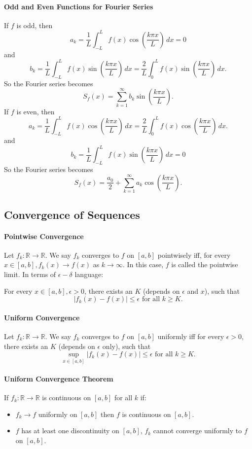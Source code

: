 \paragraph{Odd and Even Functions for Fourier Series}
If \(f\) is odd, then
\[a_k = \frac{1}{L}\int_{-L}^{L} f(x)\cos\left(\frac{k\pi x}{L}\right) \, dx = 0\]
and 
\[b_k = \frac{1}{L} \int_{-L}^L f(x)\sin\left(\frac{k\pi x}{L}\right) \, dx = \frac{2}{L}\int_0^L f(x)\sin\left(\frac{k\pi x}{L}\right) \, dx.\]
So the Fourier series becomes
\[S_f(x) = \sum_{k=1}^\infty b_k\sin\left(\frac{k\pi x}{L}\right). \tag{Fourier Sine Series}\]
If \(f\) is even, then
\[a_k = \frac{1}{L}\int_{-L}^{L} f(x)\cos\left(\frac{k\pi x}{L}\right) \, dx = \frac{2}{L}\int_0^L f(x)\cos\left(\frac{k\pi x}{L}\right) \, dx.\]
and 
\[b_k = \frac{1}{L}\int_{-L}^{L} f(x)\sin\left(\frac{k\pi x}{L}\right) \, dx = 0\]
So the Fourier series becomes
\[S_f(x) = \frac{a_0}{2} + \sum_{k=1}^\infty a_k\cos\left(\frac{k\pi x}{L}\right). \tag{Fourier Cosine Series}\]

\subsection{Convergence of Sequences}
\paragraph{Pointwise Convergence}
Let \(f_k: \mathbb R \to \mathbb R\). We say \(f_k\) converges to \(f\) on \([a,b]\) pointwisely iff, for every \(x \in [a,b], f_k(x)\to f(x)\) as \(k\to\infty\). In this case, \(f\) is called the pointwise limit.
In terms of \(\epsilon - \delta\) language:

For every \(x \in [a,b], \epsilon > 0\), there exists an \(K\) (depends on \(\epsilon\) and \(x\)), such that 
\[|f_k(x) - f(x)| \leq \epsilon \text{ for all } k \geq K.\]

\paragraph{Uniform Convergence}
Let \(f_k:\mathbb R \to \mathbb R\). We say \(f_k\) converges to \(f\) on \([a,b]\) uniformly iff for every \(\epsilon > 0\), there exists an \(K\) (depends on \(\epsilon\) only), such that 
\[\sup_{x\in[a,b]} |f_k(x) - f(x)| \leq \epsilon \text{ for all } k\geq K.\]

\paragraph{Uniform Convergence Theorem}
If \(f_k: \mathbb R \to \mathbb R\) is continuous on \([a,b]\) for all \(k\) if:
\begin{itemize}
    \item \(f_k \to f\) uniformly on \([a,b]\) then \(f\) is continuous on \([a,b]\).
    \item \(f\) has at least one discontinuity on \([a,b]\), \(f_k\) cannot converge uniformly to \(f\) on \([a,b]\).
\end{itemize}

